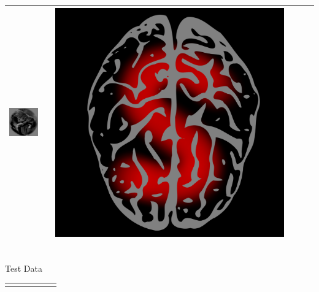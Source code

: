 \documentclass{beamer}
\newcommand{\xmark}{\textcolor{red}{\text{\sffamily X}}}
\newcommand{\cmark}{\textcolor{green}{\checkmark}}
\begin{document}
\begin{frame}
\begin{center}
\begin{tabular}{ccc||ccc}
\includegraphics[scale = .26]{img4.png} & \hspace{0.2in} & \includegraphics[scale = 0.035]{brain5.png} \\ \hline
\end{tabular}\\
\vspace{0.1in}
Test Data \\
\begin{tabular}{c|c|cccc}
\hline
 & & \xmark & \xmark & \cmark & \xmark \\

\end{tabular}
\end{center}
\end{frame}
\end{document}
